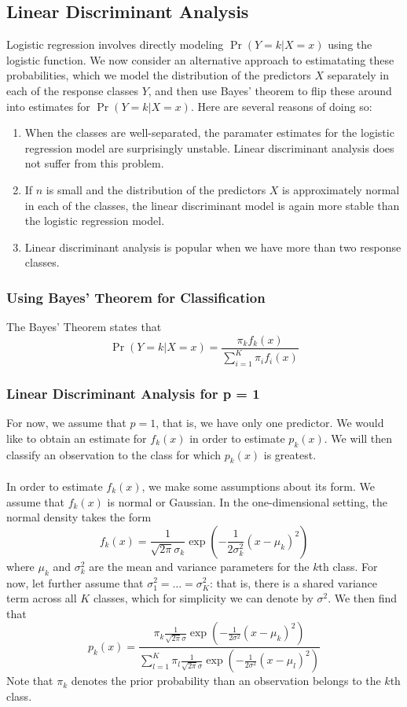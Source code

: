 \documentclass{article}
\begin{document}
\subsection{Linear Discriminant Analysis}
Logistic regression involves directly modeling $\Pr(Y=k | X= x)$ using the logistic function. We now consider an alternative approach to estimatating these probabilities, which we model the distribution of the predictors $X$ separately in each of the response classes $Y$, and then use Bayes' theorem to flip these around into estimates for $\Pr(Y = k| X = x)$. Here are several reasons of doing so:
\begin{enumerate}
\item When the classes are well-separated, the paramater estimates for the logistic regression model are surprisingly unstable. Linear discriminant analysis does not suffer from this problem. \\
\item If $n$ is small and the distribution of the predictors $X$ is approximately normal in each of the classes, the linear discriminant model is again more stable than the logistic regression model. \\
\item Linear discriminant analysis is popular when we have more than two response classes.
\end{enumerate}

\subsubsection{Using Bayes' Theorem for Classification}
The Bayes' Theorem states that
\[
	\Pr(Y = k|X = x) = \frac{\pi_k f_k(x)}{\sum_{i=1}^{K}\pi_i f_i(x)}
\]
\subsubsection{Linear Discriminant Analysis for p = 1}
For now, we assume that $p = 1$, that is, we have only one predictor. We would like to obtain an estimate for $f_k(x)$ in order to estimate $p_k(x)$. We will then classify an observation to the class for which $p_k(x)$ is greatest. \\ \\

In order to estimate $f_k(x)$, we make some assumptions about its form. We assume that $f_k(x)$ is normal or Gaussian. In the one-dimensional setting, the normal density takes the form
\[
	f_k(x) = \frac{1}{\sqrt{2\pi}\sigma_k}\exp\left(-\frac{1}{2\sigma_k^2}(x - \mu_k)^2\right)
\]
where $\mu_k$ and $\sigma_k^2$ are the mean and variance parameters for the $k$th class. For now, let further assume that $\sigma_1^2 = \ldots = \sigma_K^2$: that is, there is a shared variance term across all $K$ classes, which for simplicity we can denote by $\sigma^2$. We then find that
\[
	p_k(x) = \frac{\pi_k \frac{1}{\sqrt{2\pi}\sigma}\exp\left(-\frac{1}{2\sigma^2}(x - \mu_k)^2\right)}{\sum_{l=1}^{K}\pi_l\frac{1}{\sqrt{2\pi}\sigma}\exp\left(-\frac{1}{2\sigma^2}(x - \mu_l)^2\right)}
\]
Note that $\pi_k$ denotes the prior probability than an observation belongs to the $k$th class.
\end{document}
